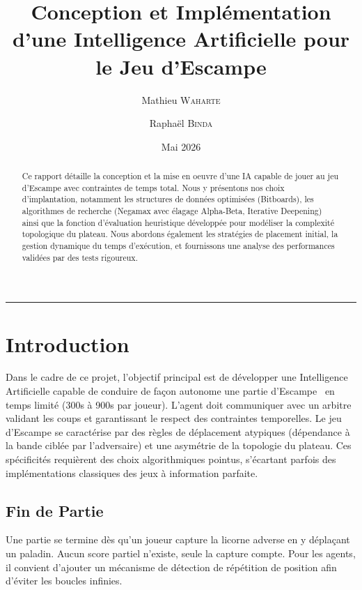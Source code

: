 \documentclass[12pt,a4paper]{article}
\title{
  \Large \textbf{Conception et Implémentation d'une Intelligence Artificielle pour le Jeu d'Escampe}\\[0.4em]
}
\author{
  Mathieu \textsc{Waharte} \and Raphaël \textsc{Binda}
}
\date{Mai 2026}
\begin{document}
\maketitle

\begin{abstract}
Ce rapport détaille la conception et la mise en oeuvre d'une IA capable de jouer au jeu d'Escampe avec contraintes de temps total. Nous y présentons nos choix d'implantation, notamment les structures de données optimisées (Bitboards), les algorithmes de recherche (Negamax avec élagage Alpha-Beta, Iterative Deepening) ainsi que la fonction d'évaluation heuristique développée pour modéliser la complexité topologique du plateau. Nous abordons également les stratégies de placement initial, la gestion dynamique du temps d'exécution, et fournissons une analyse des performances validées par des tests rigoureux.
\end{abstract}

\vspace{0.5em}
\noindent\rule{\linewidth}{0.4pt}
\tableofcontents
\vspace{1em}



\newpage
\section{Introduction}
Dans le cadre de ce projet, l'objectif principal est de développer une Intelligence Artificielle capable de conduire de façon autonome une partie d'Escampe~\cite{escampe_rules} en temps limité (300s à 900s par joueur). L'agent doit communiquer avec un arbitre validant les coups et garantissant le respect des contraintes temporelles.
Le jeu d'Escampe se caractérise par des règles de déplacement atypiques (dépendance à la bande ciblée par l'adversaire) et une asymétrie de la topologie du plateau. Ces spécificités requièrent des choix algorithmiques pointus, s'écartant parfois des implémentations classiques des jeux à information parfaite.


\subsection{Fin de Partie}
Une partie se termine dès qu'un joueur capture la licorne adverse en y déplaçant un paladin. Aucun score partiel n'existe, seule la capture compte. Pour les agents, il convient d'ajouter un mécanisme de détection de répétition de position afin d'éviter les boucles infinies.
\end{document}
